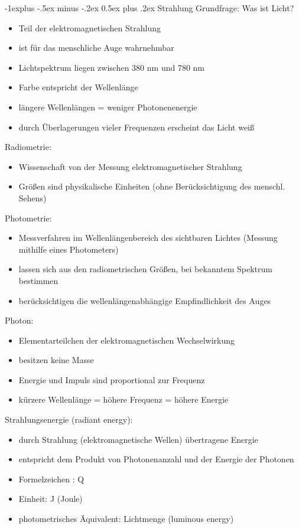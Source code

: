\documentclass[10pt,landscape]{article}
\makeatletter
\renewcommand{\subsection}{\@startsection{subsection}{2}{0mm}%
                                {-1explus -.5ex minus -.2ex}%
                                {0.5ex plus .2ex}%
                                {\normalfont\normalsize\bfseries}}
\makeatother
\begin{document}
\begin{multicols}{3}
\subsection{ Strahlung}
Grundfrage: Was ist Licht?
\begin{itemize}
  \item Teil der elektromagnetischen Strahlung
  \item ist für das menschliche Auge wahrnehmbar
  \item Lichtspektrum liegen zwischen 380 nm und 780 nm
  \item Farbe entspricht der Wellenlänge
  \item längere Wellenlängen = weniger Photonenenergie
  \item durch Überlagerungen vieler Frequenzen erscheint das Licht weiß
\end{itemize}

Radiometrie:
\begin{itemize}
  \item Wissenschaft von der Messung elektromagnetischer Strahlung
  \item Größen sind physikalische Einheiten (ohne Berücksichtigung des menschl. Sehens)
\end{itemize}

Photometrie:
\begin{itemize}
  \item Messverfahren im Wellenlängenbereich des sichtbaren Lichtes (Messung mithilfe eines Photometers)
  \item lassen sich aus den radiometrischen Größen, bei bekanntem Spektrum bestimmen
  \item berücksichtigen die wellenlängenabhängige Empfindlichkeit des Auges
\end{itemize}

Photon:
\begin{itemize}
  \item Elementarteilchen der elektromagnetischen Wechselwirkung
  \item besitzen keine Masse
  \item Energie und Impuls sind proportional zur Frequenz
  \item kürzere Wellenlänge = höhere Frequenz = höhere Energie
\end{itemize}

Strahlungsenergie (radiant energy):
\begin{itemize}
  \item durch Strahlung (elektromagnetische Wellen) übertragene Energie
  \item entspricht dem Produkt von Photonenanzahl und der Energie der Photonen
  \item Formelzeichen : Q
  \item Einheit: J (Joule)
  \item photometrisches Äquivalent: Lichtmenge (luminous energy)
\end{itemize}


\end{multicols}
\end{document}
